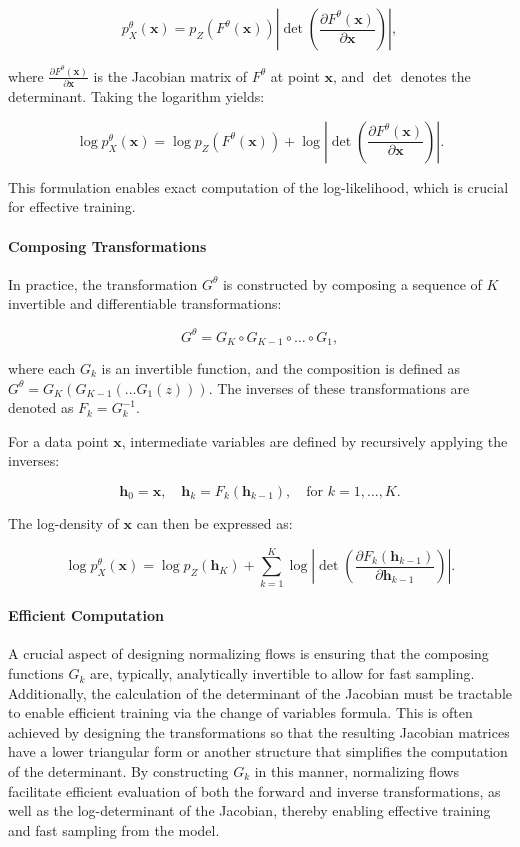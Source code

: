 \[
p^\theta_X(\mathbf{x}) = p_Z\left(F^\theta(\mathbf{x})\right) \left| \det \left( \frac{\partial F^\theta(\mathbf{x})}{\partial \mathbf{x}} \right) \right|,
\]

\noindent where $\frac{\partial F^\theta(\mathbf{x})}{\partial \mathbf{x}}$ is the Jacobian matrix of $F^\theta$ at point $\mathbf{x}$, and $\det$ denotes the determinant. Taking the logarithm yields:

\[
\log p^\theta_X(\mathbf{x}) = \log p_Z\left(F^\theta(\mathbf{x})\right) + \log \left| \det \left( \frac{\partial F^\theta(\mathbf{x})}{\partial \mathbf{x}} \right) \right|.
\]

This formulation enables exact computation of the log-likelihood, which is crucial for effective training.

\paragraph{Composing Transformations}

In practice, the transformation $G^\theta$ is constructed by composing a sequence of $K$ invertible and differentiable transformations:

\[
G^\theta = G_K \circ G_{K-1} \circ \dots \circ G_1,
\]

\noindent where each $G_k$ is an invertible function, and the composition is defined as $G^\theta = G_K(G_{K-1}(\dots G_1(z)))$. The inverses of these transformations are denoted as $F_k = G_k^{-1}$.

For a data point $\mathbf{x}$, intermediate variables are defined by recursively applying the inverses:

\[
\mathbf{h}_0 = \mathbf{x}, \quad \mathbf{h}_k = F_k(\mathbf{h}_{k-1}), \quad \text{for } k = 1, \dots, K.
\]

The log-density of $\mathbf{x}$ can then be expressed as:

\[
\log p^\theta_X(\mathbf{x}) = \log p_Z(\mathbf{h}_K) + \sum_{k=1}^{K} \log \left| \det \left( \frac{\partial F_k(\mathbf{h}_{k-1})}{\partial \mathbf{h}_{k-1}} \right) \right|.
\]

\paragraph{Efficient Computation}

A crucial aspect of designing normalizing flows is ensuring that the composing functions \( G_k \) are, typically, analytically invertible to allow for fast sampling. Additionally, the calculation of the determinant of the Jacobian must be tractable to enable efficient training via the change of variables formula. This is often achieved by designing the transformations so that the resulting Jacobian matrices have a lower triangular form or another structure that simplifies the computation of the determinant. By constructing \( G_k \) in this manner, normalizing flows facilitate efficient evaluation of both the forward and inverse transformations, as well as the log-determinant of the Jacobian, thereby enabling effective training and fast sampling from the model.
